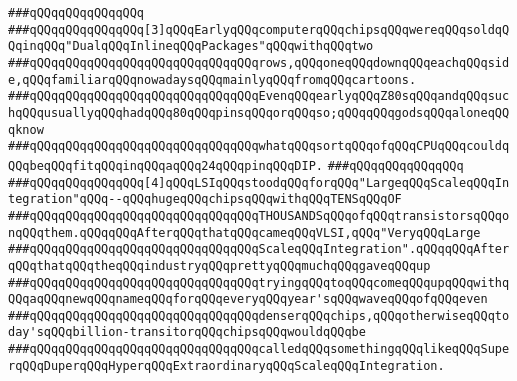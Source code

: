 \verb|###qQQqqQQqqQQqqQQq|\newline
\verb|###qQQqqQQqqQQqqQQq[3]qQQqEarlyqQQqcomputerqQQqchipsqQQqwereqQQqsoldqQQqinqQQq"DualqQQqInlineqQQqPackages"qQQqwithqQQqtwo|\newline
\verb|###qQQqqQQqqQQqqQQqqQQqqQQqqQQqqQQqrows,qQQqoneqQQqdownqQQqeachqQQqside,qQQqfamiliarqQQqnowadaysqQQqmainlyqQQqfromqQQqcartoons.|\newline
\verb|###qQQqqQQqqQQqqQQqqQQqqQQqqQQqqQQqEvenqQQqearlyqQQqZ80sqQQqandqQQqsuchqQQqusuallyqQQqhadqQQq80qQQqpinsqQQqorqQQqso;qQQqqQQqgodsqQQqaloneqQQqknow|\newline
\verb|###qQQqqQQqqQQqqQQqqQQqqQQqqQQqqQQqwhatqQQqsortqQQqofqQQqCPUqQQqcouldqQQqbeqQQqfitqQQqinqQQqaqQQq24qQQqpinqQQqDIP.|\newline
\verb|###qQQqqQQqqQQqqQQq|\newline
\verb|###qQQqqQQqqQQqqQQq[4]qQQqLSIqQQqstoodqQQqforqQQq"LargeqQQqScaleqQQqIntegration"qQQq--qQQqhugeqQQqchipsqQQqwithqQQqTENSqQQqOF|\newline
\verb|###qQQqqQQqqQQqqQQqqQQqqQQqqQQqqQQqTHOUSANDSqQQqofqQQqtransistorsqQQqonqQQqthem.qQQqqQQqAfterqQQqthatqQQqcameqQQqVLSI,qQQq"VeryqQQqLarge|\newline
\verb|###qQQqqQQqqQQqqQQqqQQqqQQqqQQqqQQqScaleqQQqIntegration".qQQqqQQqAfterqQQqthatqQQqtheqQQqindustryqQQqprettyqQQqmuchqQQqgaveqQQqup|\newline
\verb|###qQQqqQQqqQQqqQQqqQQqqQQqqQQqqQQqtryingqQQqtoqQQqcomeqQQqupqQQqwithqQQqaqQQqnewqQQqnameqQQqforqQQqeveryqQQqyear'sqQQqwaveqQQqofqQQqeven|\newline
\verb|###qQQqqQQqqQQqqQQqqQQqqQQqqQQqqQQqdenserqQQqchips,qQQqotherwiseqQQqtoday'sqQQqbillion-transitorqQQqchipsqQQqwouldqQQqbe|\newline
\verb|###qQQqqQQqqQQqqQQqqQQqqQQqqQQqqQQqcalledqQQqsomethingqQQqlikeqQQqSuperqQQqDuperqQQqHyperqQQqExtraordinaryqQQqScaleqQQqIntegration.|\newline
\newline


